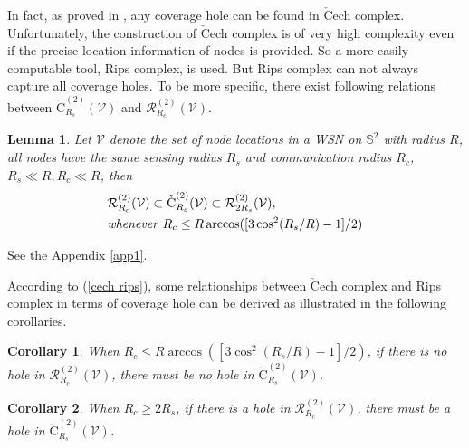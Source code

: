 \documentclass[journal, twoside]{IEEEtran}
\newtheorem{corollary}{Corollary}
\newtheorem{lemma}{Lemma}
\begin{document}
In fact, as proved in \cite{BT82}, any coverage hole can be found in 
$\check{\textrm{C}}$ech complex. Unfortunately, the construction of $\check{\textrm{C}}$ech complex 
is of very high complexity even if the precise location information of nodes is provided. So a more easily computable tool, Rips complex, is used. But Rips complex can not always capture all coverage holes. To be more specific, there exist following
relations between $\check{\textrm{C}}_{R_s}^{(2)}(\mathcal{V})$ and 
$\mathcal{R}_{R_c}^{(2)}(\mathcal{V})$.

\begin{lemma} \label{lemmaCR}
Let $\mathcal{V}$ denote the set of node locations in a WSN on 
$\mathbb{S}^2$ with radius $R$, all nodes have the same sensing
radius $R_s$ and communication radius $R_c$, $R_s \ll R, R_c \ll R$,
then
\begin{equation}\label{cech rips}
\begin{split}
 &\mathcal{R}_{R_c}^{(2)}(\mathcal{V}) \subset \check{\textrm{C}}_{R_s}^{(2)}(\mathcal{V}) \subset \mathcal{R}_{2R_s}^{(2)}(\mathcal{V}), \\
 &\emph{whenever} \hspace{4pt} R_c \leq R \arccos ([3\cos^2(R_s/R)-1]/2)
\end{split}
\end{equation} 
\end{lemma}

\begin{IEEEproof}
 See the Appendix \ref{app1}.
\end{IEEEproof}

According to (\ref{cech rips}), some relationships between $\check{\textrm{C}}$ech 
complex and Rips complex in terms of coverage hole can be derived as illustrated in 
the following corollaries.

\begin{corollary} \label{CRcase1}
When $R_c \leq R \arccos ([3\cos^2(R_s/R)-1]/2)$, if there is no hole in 
$\mathcal{R}_{R_c}^{(2)}(\mathcal{V})$, there must be no hole in 
$\check{\textrm{C}}_{R_s}^{(2)}(\mathcal{V})$.
\end{corollary}



\begin{corollary} \label{CRcase2}
When $R_c \geq 2R_s$, if there is a hole in $\mathcal{R}_{R_c}^{(2)}(\mathcal{V})$, 
there must be a hole in $\check{\textrm{C}}_{R_s}^{(2)}(\mathcal{V})$.
\end{corollary}
\end{document}
